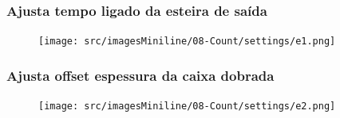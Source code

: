 \subsubsection{\small{Ajusta tempo ligado da esteira de saída}}\label{miniTelaAjustesContagemAjustaTempoLigadoEsteiraSaida}
\vspace*{\fill}
\begin{figure}[h]
  \centering
  \texttt{[image: src/imagesMiniline/08-Count/settings/e1.png]}
\end{figure}
\vspace*{\fill}

\newpage
\thispagestyle{fancy}
\vspace*{40 pt}
\subsubsection{\small{Ajusta offset espessura da caixa dobrada}}\label{miniTelaAjustesContagemAjustaOffsetEspessuraCaixaDobrada}
\vspace*{\fill}
\begin{figure}[h]
  \centering
  \texttt{[image: src/imagesMiniline/08-Count/settings/e2.png]}
\end{figure}
\vspace*{\fill}